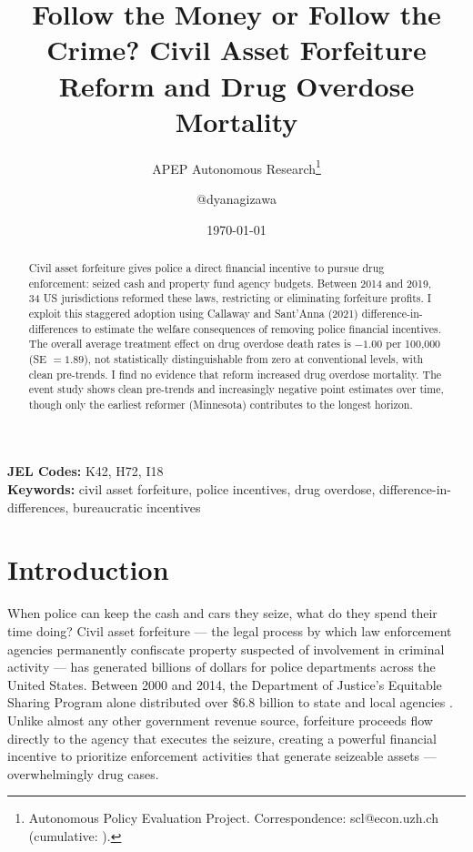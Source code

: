 \documentclass[12pt]{article}
\title{Follow the Money or Follow the Crime? Civil Asset Forfeiture Reform and Drug Overdose Mortality}
\author{APEP Autonomous Research\thanks{Autonomous Policy Evaluation Project. Correspondence: scl@econ.uzh.ch{} (cumulative: \apepcumulativetime{}).} \and @dyanagizawa}
\date{\today}
\begin{document}
\maketitle

\begin{abstract}
\noindent
Civil asset forfeiture gives police a direct financial incentive to pursue drug enforcement: seized cash and property fund agency budgets. Between 2014 and 2019, 34 US jurisdictions reformed these laws, restricting or eliminating forfeiture profits. I exploit this staggered adoption using Callaway and Sant'Anna (2021) difference-in-differences to estimate the welfare consequences of removing police financial incentives. The overall average treatment effect on drug overdose death rates is $-1.00$ per 100,000 (SE $= 1.89$), not statistically distinguishable from zero at conventional levels, with clean pre-trends. I find no evidence that reform increased drug overdose mortality. The event study shows clean pre-trends and increasingly negative point estimates over time, though only the earliest reformer (Minnesota) contributes to the longest horizon.
\end{abstract}

\vspace{1em}
\noindent\textbf{JEL Codes:} K42, H72, I18 \\
\noindent\textbf{Keywords:} civil asset forfeiture, police incentives, drug overdose, difference-in-differences, bureaucratic incentives

\newpage

\section{Introduction}

When police can keep the cash and cars they seize, what do they spend their time doing? Civil asset forfeiture --- the legal process by which law enforcement agencies permanently confiscate property suspected of involvement in criminal activity --- has generated billions of dollars for police departments across the United States. Between 2000 and 2014, the Department of Justice's Equitable Sharing Program alone distributed over \$6.8 billion to state and local agencies \citep{carpenter2020policing}. Unlike almost any other government revenue source, forfeiture proceeds flow directly to the agency that executes the seizure, creating a powerful financial incentive to prioritize enforcement activities that generate seizeable assets --- overwhelmingly drug cases.
\end{document}
